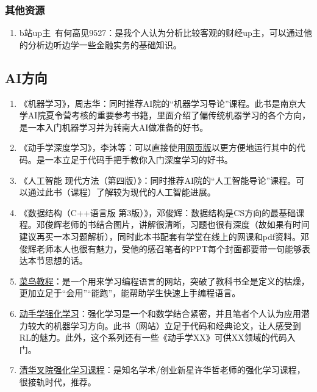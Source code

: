 \documentclass[a4paper,11pt,notitlepage]{article}
\begin{document}
\begin{appendices}
\subsubsection{其他资源}
\begin{adjustwidth}{3em}{0pt}
\begin{enumerate}
    \item b站up主\, 有何高见9527：是我个人认为分析比较客观的财经up主，可以通过他的分析边听边学一些金融实务的基础知识。
\end{enumerate}
\end{adjustwidth}

\subsection{AI方向}\label{AI推荐材料}
\begin{adjustwidth}{2em}{0pt}
\begin{enumerate}
    \item 《机器学习》，周志华：同时推荐AI院的“机器学习导论”课程。此书是南京大学AI院夏令营考核的重要参考书籍，里面介绍了偏传统机器学习的各个方向，是一本入门机器学习并为转南大AI做准备的好书。
    \item 《动手学深度学习》，李沐等：可以直接使用\href{https://zh.d2l.ai/}{网页版}以更方便地运行其中的代码。是一本立足于代码手把手教你入门深度学习的好书。
    \item 《人工智能 现代方法（第四版）》：同时推荐AI院的“人工智能导论”课程。可以通过此书（课程）了解较为现代的人工智能进展。
    \item 《数据结构（C++语言版 第3版）》，邓俊辉：数据结构是CS方向的最基础课程。邓俊辉老师的书结合图片，讲解很清晰，习题也很有深度（故如果有时间建议再买一本习题解析），同时此本书配套有学堂在线上的网课和pdf资料。邓俊辉老师本人也很有魅力，受他的感召笔者的PPT每个封面都要带一句能够表达本节思想的话。
    \item \href{https://www.runoob.com/}{菜鸟教程}：是一个用来学习编程语言的网站，突破了教科书全是定义的枯燥，更加立足于“会用”“能跑”，能帮助学生快速上手编程语言。
    \item \href{https://hrl.boyuai.com/}{动手学强化学习}：强化学习是一个和数学结合紧密，并且笔者个人认为应用潜力较大的机器学习方向。此书（网站）立足于代码和经典论文，让人感受到RL的魅力。此外，这个系列还有一些《动手学XX》可供XX领域的代码入门。
    \item \href{https://cloud.tsinghua.edu.cn/d/2176225b8d904d1d9441/}{清华叉院强化学习课程}：是知名学术/创业新星许华哲老师的强化学习课程，很接轨时代，推荐。
\end{enumerate}
\end{adjustwidth}


\end{appendices}
\end{document}
